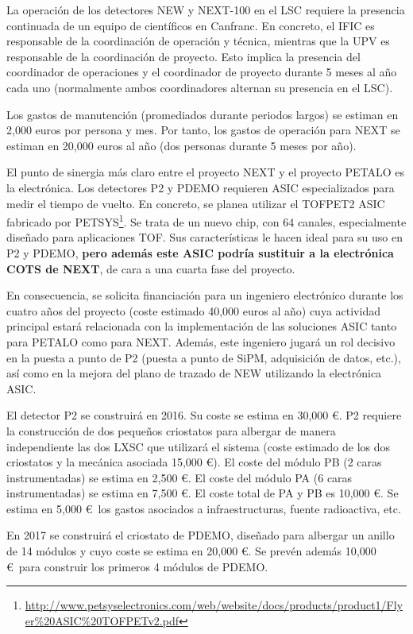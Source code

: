 La operación de los detectores NEW y NEXT-100 en el LSC requiere la presencia continuada de un equipo de científicos en Canfranc. En concreto, el IFIC es responsable de la coordinación de operación y técnica, mientras que la UPV es responsable de la coordinación de proyecto. Esto implica la presencia del coordinador de operaciones y el coordinador de proyecto durante 5 meses al año cada uno (normalmente ambos coordinadores alternan su presencia en el LSC). 

Los gastos de manutención (promediados durante periodos largos) se estiman en 2,000 euros por persona y mes. Por tanto, los gastos de operación para NEXT se estiman en 20,000 euros al año (dos personas durante 5 meses por año). 

El punto de sinergia más claro entre el proyecto NEXT y el proyecto PETALO es la electrónica. Los detectores P2 y PDEMO requieren ASIC especializados para medir el tiempo de vuelto. En concreto, se planea utilizar el 
TOFPET2 ASIC fabricado por PETSYS\footnote{\url{http://www.petsyselectronics.com/web/website/docs/products/product1/Flyer\%20ASIC\%20TOFPETv2.pdf}}. Se trata de un nuevo chip, con 64 canales, especialmente diseñado para aplicaciones TOF. Sus características le hacen ideal para su uso en P2 y PDEMO, {\bf pero además este ASIC podría sustituir a la electrónica COTS de NEXT}, de cara a una cuarta fase del proyecto. 

En consecuencia, se solicita financiación para un ingeniero electrónico durante los cuatro años del proyecto (coste estimado 40,000 euros al año) cuya actividad principal estará relacionada con la implementación de las soluciones ASIC tanto para PETALO como para NEXT. Además, este ingeniero jugará un rol decisivo en la puesta a punto de P2 (puesta a punto de SiPM, adquisición de datos, etc.), así como en la mejora del plano de trazado de NEW utilizando la electrónica ASIC. 

El detector P2 se construirá en 2016. Su coste se estima en 30,000 \euro. P2 requiere la construcción de dos pequeños criostatos para albergar de manera independiente las dos LXSC que utilizará el sistema (coste estimado de los dos criostatos y la mecánica asociada 15,000 \euro). El coste del módulo PB (2 caras instrumentadas) se estima en 2,500 \euro. El coste del módulo PA (6 caras instrumentadas) se estima en 7,500 \euro. El coste total de PA y PB es 10,000 \euro. Se estima en 5,000 \euro\ los gastos asociados a infraestructuras, fuente radioactiva, etc. 

En 2017 se construirá el criostato de PDEMO, diseñado para albergar un anillo de 14 módulos y cuyo coste se estima en 20,000 \euro. Se prevén además 10,000 \euro\ para construir los primeros 4 módulos de PDEMO.

